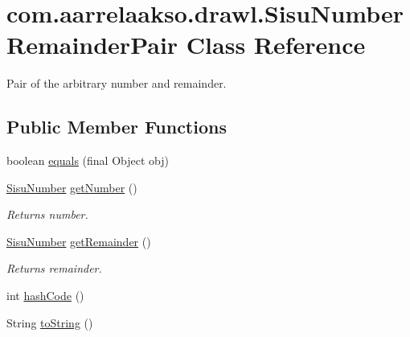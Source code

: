 \hypertarget{classcom_1_1aarrelaakso_1_1drawl_1_1_sisu_number_remainder_pair}{}\section{com.\+aarrelaakso.\+drawl.\+Sisu\+Number\+Remainder\+Pair Class Reference}
\label{classcom_1_1aarrelaakso_1_1drawl_1_1_sisu_number_remainder_pair}


Pair of the arbitrary number and remainder.  


\subsection*{Public Member Functions}
\begin{DoxyCompactItemize}
\item 
boolean \hyperlink{classcom_1_1aarrelaakso_1_1drawl_1_1_sisu_number_remainder_pair_ad019d3d5cbc76e6e66b92f6e7aed6794}{equals} (final Object obj)
\item 
\hyperlink{classcom_1_1aarrelaakso_1_1drawl_1_1_sisu_number}{Sisu\+Number} \hyperlink{classcom_1_1aarrelaakso_1_1drawl_1_1_sisu_number_remainder_pair_a0811842d4cf4746c09c81fca090f98e1}{get\+Number} ()
\begin{DoxyCompactList}\small\item\em Returns number. \end{DoxyCompactList}\item 
\hyperlink{classcom_1_1aarrelaakso_1_1drawl_1_1_sisu_number}{Sisu\+Number} \hyperlink{classcom_1_1aarrelaakso_1_1drawl_1_1_sisu_number_remainder_pair_a2fb5bd3f444211337da3ce927b821c56}{get\+Remainder} ()
\begin{DoxyCompactList}\small\item\em Returns remainder. \end{DoxyCompactList}\item 
int \hyperlink{classcom_1_1aarrelaakso_1_1drawl_1_1_sisu_number_remainder_pair_a1cb5209ed6a95a1337fea5f4c9709b33}{hash\+Code} ()
\item 
String \hyperlink{classcom_1_1aarrelaakso_1_1drawl_1_1_sisu_number_remainder_pair_a0468d2a2b1f5db91a39390dbc18de7a8}{to\+String} ()
\end{DoxyCompactItemize}
